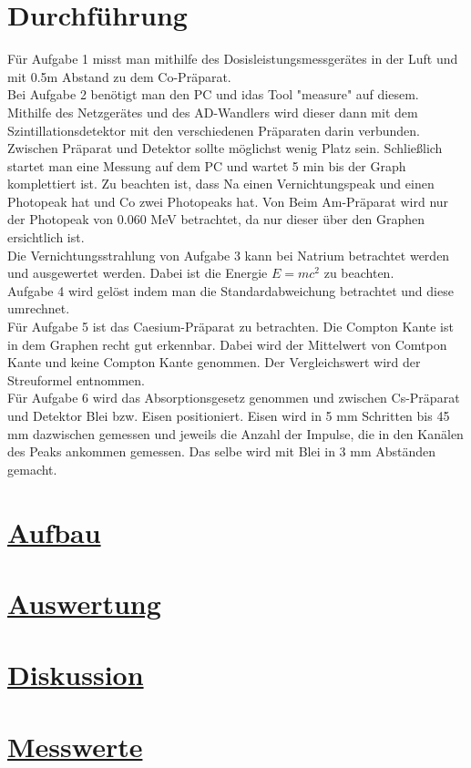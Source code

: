 \documentclass[11pt,a4paper]{article}
\begin{document}
\section{Durchführung}
Für Aufgabe 1 misst man mithilfe des Dosisleistungsmessgerätes in der Luft und 
mit 0.5m Abstand zu dem Co-Präparat. \\
Bei Aufgabe 2 benötigt man den PC und idas Tool "measure" auf diesem.
Mithilfe des Netzgerätes und des AD-Wandlers wird dieser dann mit dem Szintillationsdetektor 
mit den verschiedenen Präparaten darin verbunden.
Zwischen Präparat und Detektor sollte möglichst wenig Platz sein.
Schließlich startet man eine Messung auf dem PC und wartet 5 min bis der Graph komplettiert ist. 
Zu beachten ist, dass Na einen Vernichtungspeak und einen Photopeak hat und Co zwei Photopeaks hat. 
Von Beim Am-Präparat wird nur der Photopeak von 0.060 MeV betrachtet, da nur dieser über den Graphen ersichtlich ist.
\\Die Vernichtungsstrahlung von Aufgabe 3 kann bei Natrium betrachtet werden und ausgewertet werden.
Dabei ist die Energie $E=mc^2$ zu beachten.
\\Aufgabe 4 wird gelöst indem man die Standardabweichung betrachtet und diese umrechnet.
\\Für Aufgabe 5 ist das Caesium-Präparat zu betrachten. Die Compton Kante ist 
in dem Graphen recht gut erkennbar. Dabei wird der Mittelwert von Comtpon Kante und keine Compton Kante genommen. 
Der Vergleichswert wird der Streuformel entnommen.
\\Für Aufgabe 6 wird das Absorptionsgesetz genommen und zwischen Cs-Präparat und Detektor 
Blei bzw. Eisen positioniert. Eisen wird in 5 mm Schritten bis 45 mm dazwischen gemessen und jeweils die Anzahl 
der Impulse, die in den Kanälen des Peaks ankommen gemessen. Das selbe wird mit Blei in 3 mm Abständen gemacht.
\section{\underline{Aufbau}}
\newpage
\section{\underline{Auswertung}}
\newpage
\section{\underline{Diskussion}}
\newpage
\section{\underline{Messwerte}}
 
\end{document}
